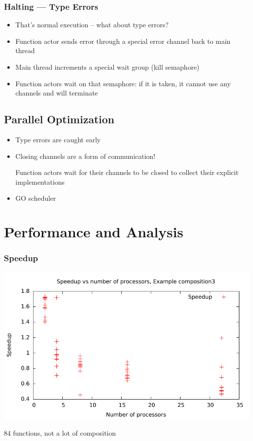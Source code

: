 \documentclass{beamer}
\begin{document}
\begin{frame}
	\frametitle{Halting --- Type Errors}

	\begin{itemize}
		\item That's normal execution -- what about type errors?
		\item Function actor sends error through a special error channel back
			to main thread
		\item Main thread increments a special wait group (kill semaphore)
		\item Function actors wait on that semaphore: if it is taken, it cannot
			use any channels and will terminate
	\end{itemize}
\end{frame}

\subsection{Parallel Optimization}

\begin{frame}
	\begin{itemize}
		\item Type errors are caught early
		\item Closing channels are a form of communication!
		
			Function actors wait for their channels to be closed to
			collect their explicit implementations
		\item GO scheduler
	\end{itemize}
\end{frame}

\section{Performance and Analysis}

\begin{frame}
	\frametitle{Speedup}
\includegraphics[scale=0.8]{../../data/composite3-speedup.pdf}

84 functions, not a lot of composition
\end{frame}
\end{document}
